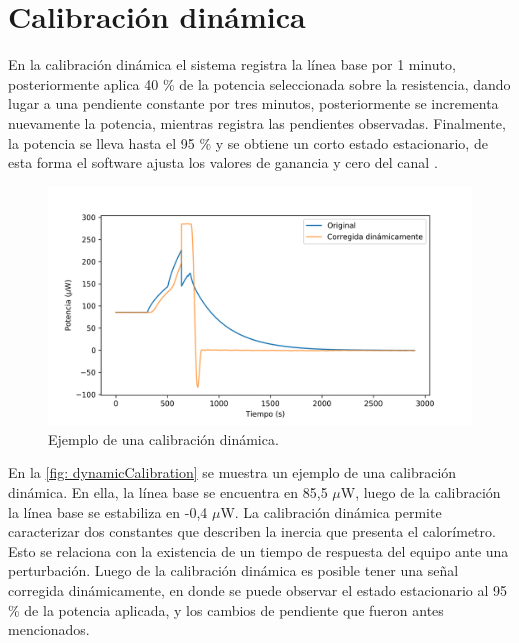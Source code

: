 	\section{Calibraci\'on din\'amica}
	En la calibración dinámica el sistema registra la línea base por 1 minuto, posteriormente aplica 40 \% de la potencia seleccionada sobre la resistencia, dando lugar a una pendiente constante por tres minutos, posteriormente se incrementa nuevamente la potencia, mientras registra las pendientes observadas. Finalmente, la potencia se lleva hasta el 95 \% y se obtiene un corto estado estacionario, de esta forma el software ajusta los valores de ganancia y cero del canal \cite{Suurkuusk}. 
	\begin{figure}[h]
		\centering
		\includegraphics[width=\linewidth]{../Data/ElectricalCalibrations/Dynamic/dynamic}
		\caption{Ejemplo de una calibración dinámica.}
		\label{fig: dynamicCalibration}
	\end{figure}

	En la \autoref{fig: dynamicCalibration} se muestra un ejemplo de una calibración dinámica. En ella, la línea base se encuentra en 85,5 $\mu$W, luego de la calibración la línea base se estabiliza en -0,4 $\mu$W. La calibración dinámica permite caracterizar dos constantes que describen la inercia que presenta el calorímetro. Esto se relaciona con la existencia de un tiempo de respuesta del equipo ante una perturbación. Luego de la calibración dinámica es posible tener una señal corregida dinámicamente, en donde se puede observar el estado estacionario al 95 \% de la potencia aplicada, y los cambios de pendiente que fueron antes mencionados.
	
